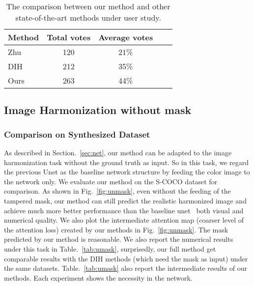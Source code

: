 \begin{table}[h]
\begin{center}
\begin{tabular}{|l|c|c|c|c|}
\hline
Method & Total votes   & Average votes  \\
\hline\hline
Zhu~\cite{Zhu:2015tl}  &  120  &   21\%   \\
DIH~\cite{Tsai:2016id} &  212  &   35\%  \\
Ours  &  263  &  44\%  \\
\hline


\end{tabular}
\end{center}

\caption{The comparison between our method and other state-of-the-art methods under user study.}

\label{tab:ustudy}

\end{table}




\subsection{Image Harmonization without mask}
\label{sec:comw}

\subsubsection{Comparison on Synthesized Dataset}

As described in Section.~\ref{sec:net}, our method can be adapted to the image harmonization task without the ground truth as input. So in this task, we regard the previous Unet as the baseline network structure by feeding the color image to the network only. We evaluate our method on the S-COCO dataset for comparison. As shown in Fig.~\ref{fig:unmask}, even without the feeding of the tampered mask, our method can still predict the realistic harmonized image and achieve much more better performance than the baseline unet~\cite{Isola:2016tp} both visual and numerical quality. We also plot the intermediate attention map (coarser level of the attention loss) created by our methods in Fig.~\ref{fig:unmask}. The mask predicted by our method is reasonable. We also report the numerical results under this task in Table.~\ref{tab:umask}, surprisedly, our full method get comparable results with the DIH methods (which need the mask as input) under the same datasets. Table.~\ref{tab:umask} also report the intermediate results of our methods. Each experiment shows the necessity in the network.


